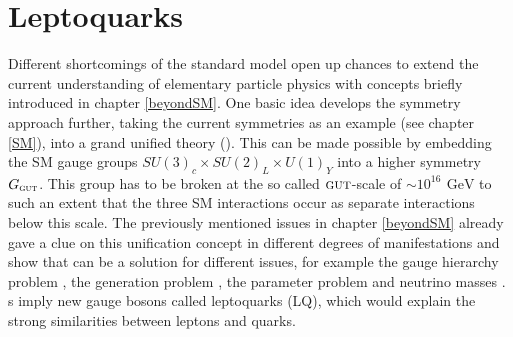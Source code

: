 \section{Leptoquarks}\label{LQmodels}
Different shortcomings of the standard model open up chances to extend the current understanding of elementary particle physics with concepts briefly introduced in chapter \ref{beyondSM}. One basic idea develops the symmetry approach further, taking the current symmetries as an example (see chapter \ref{SM}), into a grand unified theory ({\GUT}). This can be made possible by embedding the SM gauge groups $SU(3)_c\times SU(2)_L\times U(1)_Y$ into a higher symmetry $G_\text{{\textsc{gut}}}$. This group has to be broken at the so called ${\textsc{gut}}$-scale of $\sim 10^{16}\,\SI{}{\giga\electronvolt}$ to such an extent that the three SM interactions occur as separate interactions below this scale. \cite{PhysTeV} The previously mentioned issues in chapter \ref{beyondSM} already gave a clue on this unification concept in different degrees of manifestations and show that {\GUT} can be a solution for different issues, for example the gauge hierarchy problem \cite{hierarchyproblem}\cite{issuesGUT}, the generation problem \cite{issuesGUT}, the parameter problem \cite{issuesGUT} and neutrino masses \cite{neutrinoAndGUT}. {\GUT}s imply new gauge bosons called leptoquarks (LQ), which would explain the strong similarities between leptons and quarks. \cite{Nagashima}
%
%
